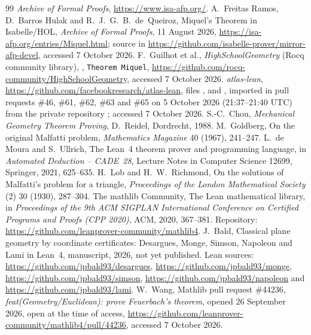 \documentclass[11pt]{article}
\theoremstyle{definition}
\theoremstyle{remark}
\newcommand{\lean}[1]{\texttt{#1}}
\begin{document}
\begin{thebibliography}{99}\sloppy
{} \emph{Archive of Formal Proofs}, \url{https://www.isa-afp.org/}.
 A.~Freitas Ramos, D.~Barros Hulak and R.~J.~G.~B.~de~Queiroz, Miquel's
Theorem in Isabelle/HOL, \emph{Archive of Formal Proofs}, 11 August 2026,
\url{https://isa-afp.org/entries/Miquel.html}; source  in
\url{https://github.com/isabelle-prover/mirror-afp-devel}, accessed 7 October 2026.
 F.~Guilhot et al., \emph{HighSchoolGeometry} (Rocq community library),
, \lean{Theorem Miquel},
\url{https://github.com/rocq-community/HighSchoolGeometry}, accessed 7 October 2026.
 \emph{atlas-lean}, \url{https://github.com/facebookresearch/atlas-lean}, files
,  and , imported
in pull requests \#46, \#61, \#62, \#63 and \#65 on 5 October 2026 (21:37--21:40 UTC) from the
private repository ; accessed 7 October 2026.
 S.-C.~Chou, \emph{Mechanical Geometry Theorem Proving}, D.~Reidel, Dordrecht, 1988.
 M.~Goldberg, On the original Malfatti problem, \emph{Mathematics Magazine}
40 (1967), 241--247.
 L.~de Moura and S.~Ullrich, The Lean~4 theorem prover and programming language, in
\emph{Automated Deduction -- CADE~28}, Lecture Notes in Computer Science 12699, Springer, 2021,
625--635.
 H.~Lob and H.~W.~Richmond, On the solutions of Malfatti's problem for a
triangle, \emph{Proceedings of the London Mathematical Society} (2) 30 (1930), 287--304.
 The mathlib Community, The Lean mathematical library, in \emph{Proceedings of the
9th ACM SIGPLAN International Conference on Certified Programs and Proofs (CPP 2020)}, ACM, 2020,
367--381. Repository: \url{https://github.com/leanprover-community/mathlib4}.
 J.~Bald, Classical plane geometry by coordinate certificates: Desargues, Monge,
Simson, Napoleon and Lami in Lean~4, manuscript, 2026, not yet published. Lean sources:
\url{https://github.com/jpbald93/desargues}, \url{https://github.com/jpbald93/monge},
\url{https://github.com/jpbald93/simson}, \url{https://github.com/jpbald93/napoleon} and
\url{https://github.com/jpbald93/lami}.
 W.~Wang, Mathlib pull request \#44236, \emph{feat(Geometry/Euclidean): prove
Feuerbach's theorem}, opened 26 September 2026, open at the time of access,
\url{https://github.com/leanprover-community/mathlib4/pull/44236}, accessed 7 October 2026.

\end{thebibliography}
\end{document}
